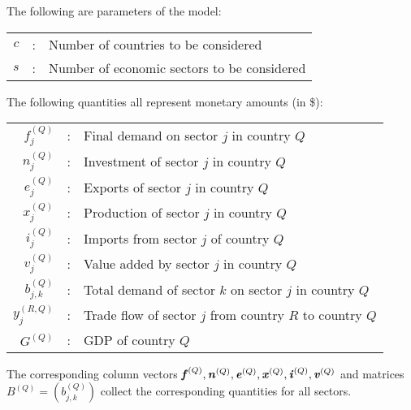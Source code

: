 \documentclass[preprint,authoryear,3p]{elsarticle}
\begin{document}
\noindent The following are parameters of the model: \vspace{2mm}

\begin{tabular}{rcl}
$c$ & : & Number of countries to be considered \vspace{2mm} \\
$s$ & : & Number of economic sectors to be considered \vspace{2mm} \\
\end{tabular}

\noindent The following quantities all represent monetary amounts (in \$): \vspace{2mm}

\begin{tabular}{rcl}
$f^{(Q)}_j$ & : & Final demand on sector $j$ in country $Q$ \vspace{2mm} \\
$n^{(Q)}_j$ & : & Investment of sector $j$ in country $Q$ \vspace{2mm} \\
$e^{(Q)}_j$ & : & Exports of sector $j$ in country $Q$ \vspace{2mm} \\
$x^{(Q)}_j$ & : & Production of sector $j$ in country $Q$ \vspace{2mm} \\
$i^{(Q)}_j$ & : & Imports from sector $j$ of country $Q$ \vspace{2mm} \\
$v^{(Q)}_j$ & : & Value added by sector $j$ in country $Q$ \vspace{2mm} \\
$b^{(Q)}_{j,k}$ & : & Total demand of sector $k$ on sector $j$ in country $Q$ \vspace{2mm} \\
$y^{(R,Q)}_{j}$ & : & Trade flow of sector $j$ from country $R$ to country $Q$ \vspace{2mm} \\
$G^{(Q)}$ & : & GDP of country $Q$ \vspace{2mm}
\end{tabular}

\noindent The corresponding column vectors $\textbf{\textit{f}}^{(Q)},\textbf{\textit{n}}^{(Q)},\textbf{\textit{e}}^{(Q)},\textbf{\textit{x}}^{(Q)},\textbf{\textit{i}}^{(Q)},\textbf{\textit{v}}^{(Q)}$ and matrices $B^{(Q)} = \left( b^{(Q)}_{j,k} \right)$ collect the corresponding quantities for all sectors. \\
\end{document}
